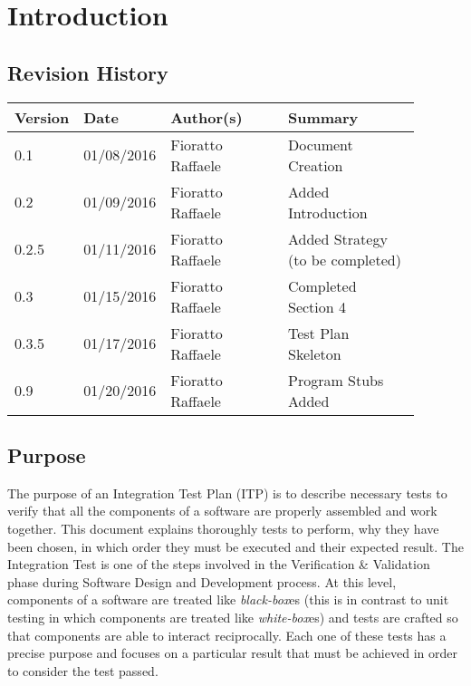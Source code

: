 \newpage
\section{Introduction}
\subsection{Revision History}
\begin{table}[H]
	\centering
	\begin{tabular*}{\linewidth}{|p{0.1\linewidth}|p{0.13\linewidth}|p{0.3099\linewidth}|p{0.3499\linewidth}|}
		\hline
		\textbf{Version} & \textbf{Date}       & \textbf{Author(s)}         & \textbf{Summary}           \\ \hline
		0.1     & 01/08/2016 & Fioratto Raffaele & Document Creation \\ \hline
		0.2		& 01/09/2016 & Fioratto Raffaele & Added Introduction \\ \hline
		0.2.5	& 01/11/2016 & Fioratto Raffaele & Added Strategy (to be completed) \\ \hline 
		0.3		& 01/15/2016 & Fioratto Raffaele & Completed Section 4 \\ \hline
		0.3.5	& 01/17/2016 & Fioratto Raffaele & Test Plan Skeleton \\ \hline
		0.9 & 01/20/2016 & Fioratto Raffaele & Program Stubs Added \\ \hline
	\end{tabular*}
\end{table}
\break
\subsection{Purpose}
The purpose of an Integration Test Plan (ITP) is to describe necessary tests to verify that all the components of a software are properly assembled and work together. This document explains thoroughly tests to perform, why they have been chosen, in which order they must be executed and their expected result. The Integration Test is one of the steps involved in the Verification \& Validation phase during Software Design and Development process. At this level, components of a software are treated like \textit{black-box}es (this is in contrast to unit testing in which components are treated like \textit{white-box}es) and tests are crafted so that components are able to interact reciprocally. Each one of these tests has a precise purpose and focuses on a particular result that must be achieved in order to consider the test passed.
